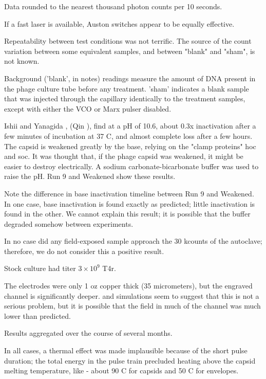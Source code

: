 \documentclass[paper.tex]{subfiles}
\begin{document}
\begin{multicols}{1}
Data rounded to the nearest thousand photon counts per 10 seconds. %

If a fast laser is available, Auston switches appear to be equally effective.


Repeatability between test conditions was not terrific. The source of the  count variation between some equivalent samples, and between "blank" and "sham", is not known.

Background ('blank', in notes) readings measure the amount of DNA present in the phage culture tube before any treatment. 'sham' indicates a blank sample that was injected through the capillary identically to the treatment samples, except with either the VCO or Marx pulser disabled.

Ishii and Yanagida \cite{two1977}, (Qin \cite{Structure2010}), find at a pH of 10.6, about 0.3x inactivation after a few minutes of incubation at 37 C, and almost complete loss after a few hours. The capsid is weakened greatly by the base, relying on the "clamp proteins" hoc and soc. It was thought that, if the phage capsid was weakened, it might be easier to destroy electrically. A sodium carbonate-bicarbonate buffer was used to raise the pH. Run 9 and Weakened show these results. 

Note the difference in base inactivation timeline between Run 9 and Weakened. In one case, base inactivation is found exactly as predicted; little inactivation is found in the other. We cannot explain this result; it is possible that the buffer degraded somehow between experiments.

In no case did any field-exposed sample approach the 30 kcounts of the autoclave; therefore, we do not consider this a positive result.

Stock culture had titer $3\times 10^9$ T4r.

The electrodes were only 1 oz copper thick (35 micrometers), but the engraved channel is significantly deeper. 
\cite{Nanosecond2006} and simulations seem to suggest that this is not a serious problem, but it is possible that the field in much of the channel was much lower than predicted.

Results aggregated over the course of several months.

In all cases, a thermal effect was made implausible because of the short pulse duration; the total energy in the pulse train precluded heating above the capsid melting temperature, like\cite{Effects1951} - about 90 C for capsids \cite{Thermal1999} and 50 C for envelopes\cite{Stability1985}.


\end{multicols}
\end{document}
